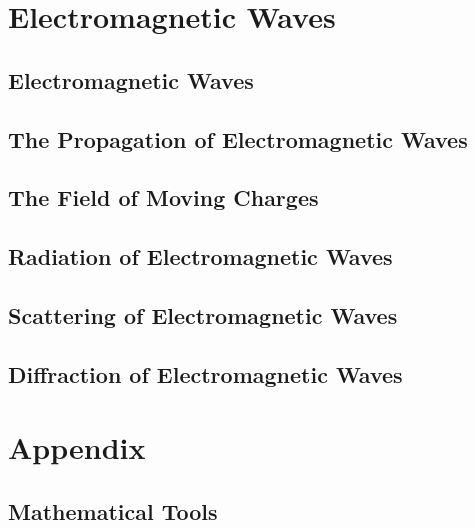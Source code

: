 \documentclass[
    a4paper
    11pt,
    oneside,
    onecolumn,
    openright,
    final
]{memoir}
\numberwithin{equation}{section}
\begin{document}
\part{Electromagnetic Waves}

\chapter{Electromagnetic Waves}

\chapter{The Propagation of Electromagnetic Waves}

\chapter{The Field of Moving Charges}

\chapter{Radiation of Electromagnetic Waves}

\chapter{Scattering of Electromagnetic Waves}

\chapter{Diffraction of Electromagnetic Waves}

\appendix
\part{Appendix}

\chapter{Mathematical Tools}

\backmatter
\end{document}
